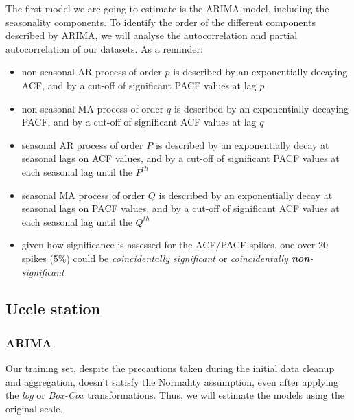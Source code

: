\documentclass[12pt]{article}
\begin{document}
The first model we are going to estimate is the ARIMA model, including the seasonality components. To identify the order of the different components described by ARIMA, we will analyse the autocorrelation and partial autocorrelation of our datasets.
As a reminder:
\begin{itemize}[topsep=0.5em,itemsep=0em,partopsep=0.5em]
	\item non-seasonal AR process of order $p$ is described by an exponentially decaying ACF, and by a cut-off of significant PACF values at lag $p$
	\item non-seasonal MA process of order $q$ is described by an exponentially decaying PACF, and by a cut-off of significant ACF values at lag $q$
	\item seasonal AR process of order $P$ is described by an exponentially decay at seasonal lags on ACF values, and by a cut-off of significant PACF values at each seasonal lag until the $P^{th}$
	\item seasonal MA process of order $Q$ is described by an exponentially decay at seasonal lags on PACF values, and by a cut-off of significant ACF values at each seasonal lag until the $Q^{th}$
	\item given how significance is assessed for the ACF/PACF spikes, one over 20 spikes (5\%) could be \textit{coincidentally significant} or \textit{coincidentally \textbf{non}-significant}
\end{itemize}


\subsection{Uccle station}
\subsubsection{ARIMA}
Our training set, despite the precautions taken during the initial data cleanup and aggregation, doesn't satisfy the Normality assumption, even after applying the \textit{log} or \textit{Box-Cox} transformations. Thus, we will estimate the models using the original scale.
\end{document}
